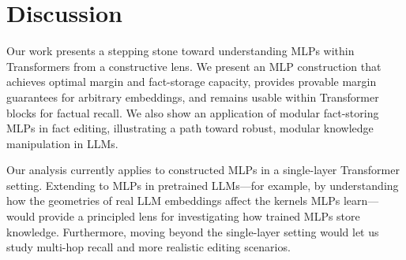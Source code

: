 \section{Discussion}

Our work presents a stepping stone toward understanding MLPs within Transformers from a constructive lens.
We present an MLP construction that achieves optimal margin and fact-storage capacity, provides provable margin guarantees for arbitrary embeddings, and remains usable within Transformer blocks for factual recall.
We also show an application of modular fact-storing MLPs in fact editing, illustrating a path toward robust, modular knowledge manipulation in LLMs.

Our analysis currently applies to constructed MLPs in a single-layer Transformer setting.
Extending to MLPs in pretrained LLMs---for example, by understanding how the geometries of real LLM embeddings affect the kernels MLPs learn---would provide a principled lens for investigating how trained MLPs store knowledge.
Furthermore, moving beyond the single-layer setting would let us study multi-hop recall and more realistic editing scenarios.